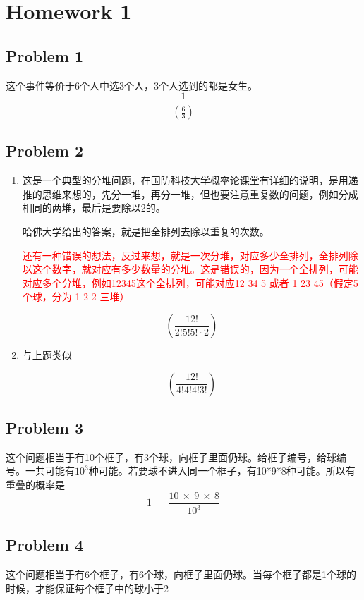 \documentclass{article}
\begin{document}
\clearpage


\section*{Homework 1}
\subsection*{Problem 1}
这个事件等价于6个人中选3个人，3个人选到的都是女生。
$$
\frac{1}{\left( \frac{6}{3} \right)  } 
$$

\clearpage
\subsection*{Problem 2}
\begin{enumerate}[label=(\alph*)]
\item 这是一个典型的分堆问题，在国防科技大学概率论课堂有详细的说明，是用递推的思维来想的，先分一堆，再分一堆，但也要注意重复数的问题，例如分成相同的两堆，最后是要除以2的。

哈佛大学给出的答案，就是把全排列去除以重复的次数。


\textcolor{red}{还有一种错误的想法，反过来想，就是一次分堆，对应多少全排列，全排列除以这个数字，就对应有多少数量的分堆。这是错误的，因为一个全排列，可能对应多个分堆，例如12345这个全排列，可能对应12 34 5 或者 1 23 45（假定5个球，分为 1 2 2 三堆）}

$$
\left( \frac{12!}{2!5!5!\cdot 2} \right)  
$$

\item 与上题类似

$$
\left( \frac{12!}{4!4!4!3!} \right)  
$$

\end{enumerate}

\clearpage


\subsection*{Problem 3}
这个问题相当于有10个框子，有3个球，向框子里面仍球。给框子编号，给球编号。一共可能有$10^{3}$种可能。若要球不进入同一个框子，有10*9*8种可能。所以有重叠的概率是 
$$
1\  -\  \frac{10\  \times \  9\  \times \  8}{{}10^{3}} 
$$

\clearpage

\subsection*{Problem 4}
这个问题相当于有6个框子，有6个球，向框子里面仍球。当每个框子都是1个球的时候，才能保证每个框子中的球小于2
\end{document}
